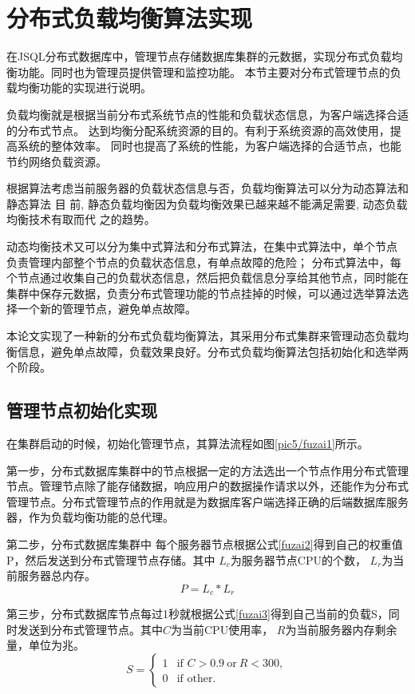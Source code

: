 \section{分布式负载均衡算法实现}
在JSQL分布式数据库中，管理节点存储数据库集群的元数据，实现分布式负载均衡功能。同时也为管理员提供管理和监控功能。
本节主要对分布式管理节点的负载均衡功能的实现进行说明。

负载均衡就是根据当前分布式系统节点的性能和负载状态信息，为客户端选择合适的分布式节点。
达到均衡分配系统资源的目的。有利于系统资源的高效使用，提高系统的整体效率。
同时也提高了系统的性能，为客户端选择的合适节点，也能节约网络负载资源。


根据算法考虑当前服务器的负载状态信息与否，负载均衡算法可以分为动态算法和静态算法
目
前, 静态负载均衡因为负载均衡效果已越来越不能满足需要, 动态负载均衡技术有取而代
之的趋势。

动态均衡技术又可以分为集中式算法和分布式算法，在集中式算法中，单个节点
负责管理内部整个节点的负载状态信息，有单点故障的危险；
分布式算法中，每个节点通过收集自己的负载状态信息，然后把负载信息分享给其他节点，同时能在集群中保存元数据，负责分布式管理功能的节点挂掉的时候，可以通过选举算法选择一个新的管理节点，避免单点故障。

本论文实现了一种新的分布式负载均衡算法，其采用分布式集群来管理动态负载均衡信息，避免单点故障，负载效果良好。分布式负载均衡算法包括初始化和选举两个阶段。
\subsection{管理节点初始化实现}
在集群启动的时候，初始化管理节点，其算法流程如图\ref{pic5/fuzai1}所示。

第一步，分布式数据库集群中的节点根据一定的方法选出一个节点作用分布式管理节点。管理节点除了能存储数据，响应用户的数据操作请求以外，还能作为分布式管理节点。分布式管理节点的作用就是为数据库客户端选择正确的后端数据库服务器，作为负载均衡功能的总代理。

第二步，分布式数据库集群中
每个服务器节点根据公式\ref{fuzai2}得到自己的权重值P，然后发送到分布式管理节点存储。其中
$ L_c $为服务器节点CPU的个数， $ L_r $为当前服务器总内存。
\begin{equation}
P=L_c * L_r \label{fuzai2}
\end{equation}

第三步，分布式数据库节点每过1秒就根据公式\ref{fuzai3}得到自己当前的负载S，同时发送到分布式管理节点。其中$ C $为当前CPU使用率， $ R $为当前服务器内存剩余量，单位为兆。
\begin{equation}
S =
\begin{cases}
1 & \text{if } C >0.9 \: \text{or} \: R<300,\\
0 & \text{if } \text{other}.
\end{cases}   \label{fuzai3}
\end{equation}

